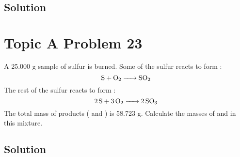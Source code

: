 \documentclass[10pt]{article}
\begin{document}
        \subsection{Solution}

    \pagebreak
    \section{Topic A Problem 23}
        A 25.000 g sample of sulfur is burned. 
        Some of the sulfur reacts to form :
        \begin{equation}
            \ce{S + O2 -> SO2}
        \end{equation}
        The rest of the sulfur reacts to form :
        \begin{equation}
            \ce{2 S + 3 O2 -> 2 SO3}
        \end{equation}
        The total mass of products ( and ) is 58.723 g. 
        Calculate the masses of  and  in this mixture.

        \subsection{Solution}



\end{document}
